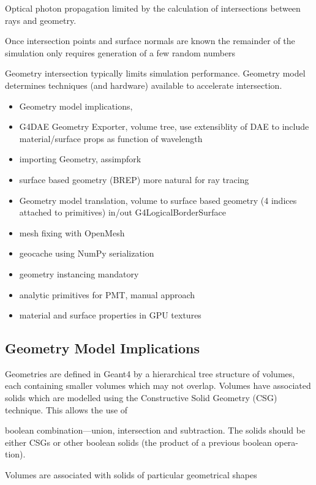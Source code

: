 \documentclass[a4paper]{jpconf}
\begin{document}
Optical photon propagation limited by the calculation of intersections between 
rays and geometry. 


Once intersection points and surface normals are known the remainder of the 
simulation only requires generation of a few random numbers 

Geometry intersection typically limits simulation performance. Geometry model
determines techniques (and hardware) available to accelerate intersection.

\begin{itemize}
\item Geometry model implications, 
\item G4DAE Geometry Exporter, volume tree, use extensiblity of DAE to include material/surface props as function of wavelength
\item importing Geometry, assimpfork \cite{Assimp} \cite{AssimpFork}
\item surface based geometry (BREP) more natural for ray tracing 
\item Geometry model translation, volume to surface based geometry (4 indices attached to primitives) in/out G4LogicalBorderSurface
\item mesh fixing with OpenMesh\cite{OpenMesh}
\item geocache using NumPy serialization
\item geometry instancing mandatory
\item analytic primitives for PMT, manual approach 
\item material and surface properties in GPU textures
\end{itemize}

\subsection{Geometry Model Implications}




Geometries are defined in Geant4 by a hierarchical tree structure of volumes, each containing smaller volumes
which may not overlap. Volumes have associated solids which are modelled using 
the Constructive Solid Geometry (CSG) technique. This allows the use of 

boolean combination—union, intersection and subtraction. The solids should be either CSGs or other boolean solids (the product of a previous boolean opera- tion).




Volumes are associated with solids of particular geometrical shapes 
\end{document}
